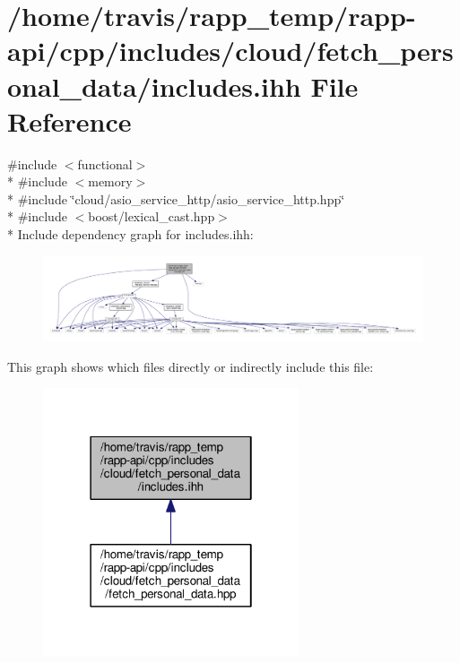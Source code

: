 \hypertarget{cloud_2fetch__personal__data_2includes_8ihh}{\section{/home/travis/rapp\-\_\-temp/rapp-\/api/cpp/includes/cloud/fetch\-\_\-personal\-\_\-data/includes.ihh File Reference}
\label{cloud_2fetch__personal__data_2includes_8ihh}
}
{\ttfamily \#include $<$functional$>$}\\*
{\ttfamily \#include $<$memory$>$}\\*
{\ttfamily \#include \char`\"{}cloud/asio\-\_\-service\-\_\-http/asio\-\_\-service\-\_\-http.\-hpp\char`\"{}}\\*
{\ttfamily \#include $<$boost/lexical\-\_\-cast.\-hpp$>$}\\*
Include dependency graph for includes.\-ihh\-:
\nopagebreak
\begin{figure}[H]
\begin{center}
\leavevmode
\includegraphics[width=350pt]{cloud_2fetch__personal__data_2includes_8ihh__incl}
\end{center}
\end{figure}
This graph shows which files directly or indirectly include this file\-:
\nopagebreak
\begin{figure}[H]
\begin{center}
\leavevmode
\includegraphics[width=214pt]{cloud_2fetch__personal__data_2includes_8ihh__dep__incl}
\end{center}
\end{figure}
